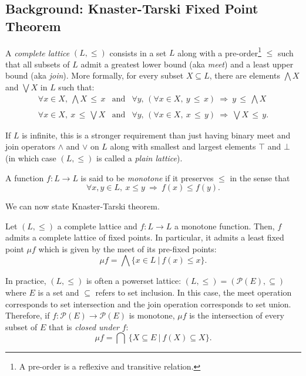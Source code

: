 \documentclass{article} \usepackage{chtt-notes} \usepackage{stmaryrd}
\newcommand{\meet}[1]{\bigwedge\!#1}
\newcommand{\join}[1]{\bigvee\!#1}
\begin{document}
\subsection{Background: Knaster-Tarski Fixed Point Theorem}

A \emph{complete lattice} $(L, \leq)$ consists in a set $L$ along with
a pre-order\footnote{A pre-order is a reflexive and transitive
  relation.} $\leq$ such that all subsets of $L$ admit a greatest
lower bound (aka \emph{meet}) and a least upper bound (aka
\emph{join}).  More formally, for every subset $X \subseteq L$, there
are elements $\meet{X}$ and $\join{X}$ in $L$ such that:
\[\begin{array}{ccc}
    \forall x\in X, \ \meet{X} \,\leq\, x  &  \text{and}  &
    \forall y,\, \left( \forall x\in X, \ y \,\leq\, x  \right) \ \Longrightarrow \ 
    y \,\leq\, \meet{X} \\ \\
    \forall x\in X, \ x \,\leq\, \join{X}  & \text{and}  &
    \forall y,\, \left( \forall x\in X, \ x \,\leq\, y  \right) \ \Longrightarrow \ 
    \join{X} \,\leq\, y.
  \end{array}\]
\begin{remark*}
  If $L$ is infinite, this is a stronger requirement than just having
  binary meet and join operators $\wedge$ and $\vee$ on $L$ along with
  smallest and largest elements $\top$ and $\bot$ (in which case
  $(L, \leq)$ is called a \emph{plain lattice}).
\end{remark*}
A function $f : L \to L$ is said to be \emph{monotone} if it preserves
$\leq$ in the sense that
\[ \forall x, y \in L, \ x \leq y \ \Longrightarrow \ f(x) \leq
  f(y).\]

We can now state Knaster-Tarski theorem.

\begin{theorem*}
  Let $(L, \leq)$ a complete lattice and $f : L \to L$ a monotone
  function.  Then, $f$ admits a complete lattice of fixed points. In
  particular, it admits a least fixed point $\mu f$ which is given by
  the meet of its pre-fixed points:
  \[ \mu f = \bigwedge \{ x \in L \ |\ f(x) \leq x\}.\]
\end{theorem*}

In practice, $(L, \leq)$ is often a powerset lattice:
$(L, \leq) = (\mathcal{P}(E), \subseteq)$ where $E$ is a set and
$\subseteq$ refers to set inclusion. In this case, the meet operation
corresponds to set intersection and the join operation corresponds to
set union. Therefore, if $f : \mathcal{P}(E) \to \mathcal{P}(E)$ is
monotone, $\mu f$ is the intersection of every subset of $E$ that is
\emph{closed under} $f$:
\[ \mu f = \bigcap \ \{ X \subseteq E \ | \ f(X) \subseteq X \}. \]
\end{document}
